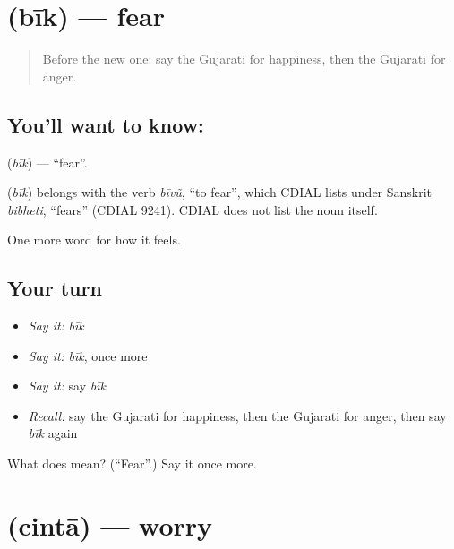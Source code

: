 \section[\texorpdfstring{\gu{બીક} (bīk)}{બીક (bīk)}]{ (bīk) — fear}

\label{lesson:GU-C50-fear}



\begin{quote}
Before the new one: say the Gujarati for happiness, then the Gujarati for anger.
\end{quote}

\subsection*{You'll want to know: }
\textbf{} (\emph{bīk}) — \textquotedblleft{}fear\textquotedblright{}.

\begin{cousinweb}
\textbf{} (\emph{bīk}) belongs with the verb \emph{bīvũ}, \textquotedblleft{}to fear\textquotedblright{}, which CDIAL lists under Sanskrit \emph{bibheti}, \textquotedblleft{}fears\textquotedblright{} (CDIAL 9241). CDIAL does not list the noun itself.
\end{cousinweb}

\begin{grammarlens}[title={What you've built}]
One more word for how it feels.
\end{grammarlens}

\subsection*{Your turn}
\begin{itemize}
\raggedright
  \item \emph{Say it:} \emph{bīk}
  \item \emph{Say it:} \emph{bīk}, once more
  \item \emph{Say it:} say \emph{bīk}
  \item \emph{Recall:} say the Gujarati for happiness, then the Gujarati for anger, then say \emph{bīk} again
\end{itemize}

\begin{tcolorbox}[breakable,colback=teal!4,colframe=teal!35!black,title={Before you move on}]
What does  mean? (\textquotedblleft{}Fear\textquotedblright{}.) Say it once more.
\end{tcolorbox}
\section[\texorpdfstring{\gu{ચિંતા} (cintā)}{ચિંતા (cintā)}]{ (cintā) — worry}

